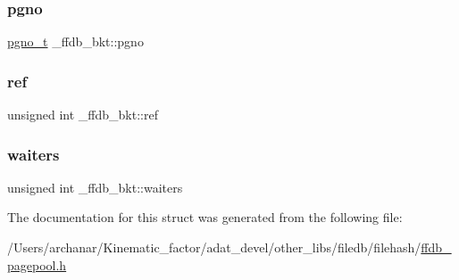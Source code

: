 \subsubsection{\texorpdfstring{pgno}{pgno}}
{\footnotesize\ttfamily \mbox{\hyperlink{other__libs_2filedb_2filehash_2ffdb__db_8h_a000813331643d38481142bcce7de1501}{pgno\+\_\+t}} \+\_\+ffdb\+\_\+bkt\+::pgno}

\mbox{\label{struct__ffdb__bkt_ae27dcd0825bacac9b31bdba869b70cac}} 
\subsubsection{\texorpdfstring{ref}{ref}}
{\footnotesize\ttfamily unsigned int \+\_\+ffdb\+\_\+bkt\+::ref}

\mbox{\label{struct__ffdb__bkt_a3bfeeda182190ed60dbf8f46dcf64630}} 
\subsubsection{\texorpdfstring{waiters}{waiters}}
{\footnotesize\ttfamily unsigned int \+\_\+ffdb\+\_\+bkt\+::waiters}



The documentation for this struct was generated from the following file\+:\begin{DoxyCompactItemize}
\item 
/\+Users/archanar/\+Kinematic\+\_\+factor/adat\+\_\+devel/other\+\_\+libs/filedb/filehash/\mbox{\hyperlink{ffdb__pagepool_8h}{ffdb\+\_\+pagepool.\+h}}\end{DoxyCompactItemize}
